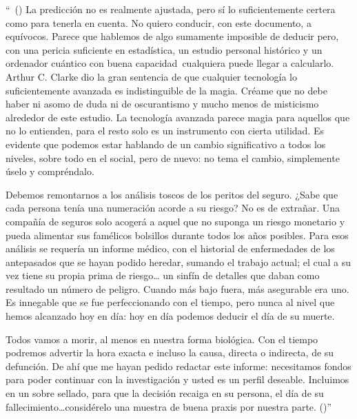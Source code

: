 \begin{em}
``\ (\textellipsis) La predicción no es realmente ajustada, pero sí lo suficientemente certera como para tenerla en cuenta. No quiero conducir, con este documento, a equívocos. Parece que hablemos de algo sumamente imposible de deducir pero, con una pericia suficiente en estadística, un estudio personal histórico y un ordenador cuántico con buena capacidad\textellipsis\ cualquiera puede llegar a calcularlo. Arthur C. Clarke dio la gran sentencia de que cualquier tecnología lo suficientemente avanzada es indistinguible de la magia. Créame que no debe haber ni asomo de duda ni de oscurantismo y mucho menos de misticismo alrededor de este estudio. La tecnología avanzada parece magia para aquellos que no lo entienden, para el resto solo es un instrumento con cierta utilidad. Es evidente que podemos estar hablando de un cambio significativo a todos los niveles, sobre todo en el social, pero de nuevo: no tema el cambio, simplemente úselo y compréndalo. 

Debemos remontarnos a los análisis toscos de los peritos del seguro. ¿Sabe que cada persona tenía una numeración acorde a su riesgo? No es de extrañar. Una compañía de seguros solo acogerá a aquel que no suponga un riesgo monetario y pueda alimentar sus famélicos bolsillos durante todos los años posibles. Para esos análisis se requería un informe médico, con el historial de enfermedades de los antepasados que se hayan podido heredar, sumando el trabajo actual; el cual a su vez tiene su propia prima de riesgo… un sinfín de detalles que daban como resultado un número de peligro. Cuando más bajo fuera, más asegurable era uno. Es innegable que se fue perfeccionando con el tiempo, pero nunca al nivel que hemos alcanzado hoy en día: hoy en día podemos deducir el día de su muerte. 

Todos vamos a morir, al menos en nuestra forma biológica. Con el tiempo podremos advertir la hora exacta e incluso la causa, directa o indirecta, de su defunción. De ahí que me hayan pedido redactar este informe: necesitamos fondos para poder continuar con la investigación y usted es un perfil deseable. Incluimos en un sobre sellado, para que la decisión recaiga en su persona, el día de su fallecimiento…considérelo una muestra de buena praxis por nuestra parte. (\textellipsis)''
\end{em}